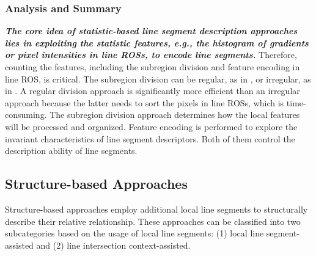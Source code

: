 \documentclass[journal,compsoc]{IEEEtran}
\begin{document}
\subsubsection{Analysis and Summary}
\textbf{\textit{The core idea of statistic-based line segment description approaches lies in exploiting the statistic features, \textit{e.g.}, the histogram of gradients or pixel intensities in line ROSs, to encode line segments.}} Therefore, counting the features, including the subregion division and feature encoding in line ROS, is critical. The subregion division can be regular, as in \cite{LBD}, or irregular, as in \cite{ALineMatchingMethodBasedonMultipleIntensityOrderingwithUniformlySpacedSampling}. A regular division approach is significantly more efficient than an irregular approach because the latter needs to sort the pixels in line ROSs, which is  time-consuming. The subregion division approach determines how the local features will be processed and organized. Feature encoding is performed to explore the invariant characteristics of line segment descriptors. Both of them control the description ability of line segments.


\subsection{Structure-based Approaches}\label{subsec_description_structure}
Structure-based approaches employ additional local line segments to structurally describe their relative relationship. These approaches can be classified into two subcategories based on the usage of local line segments: (1) local line segment-assisted and (2) line intersection context-assisted.
\end{document}
